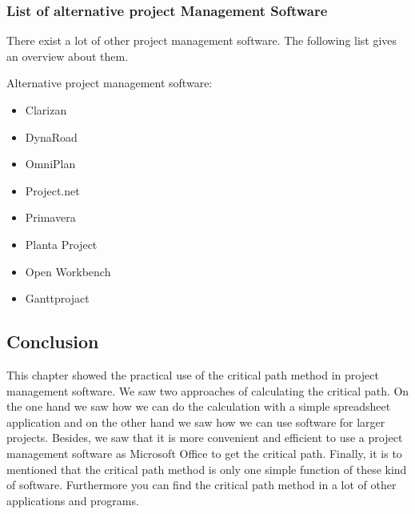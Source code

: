 \subsubsection{List of alternative project Management Software}
There exist a lot of other project management software. The following list gives an overview about them.

Alternative project management software:
\begin{itemize}
\item Clarizan
\item DynaRoad
\item OmniPlan
\item Project.net
\item Primavera
\item Planta Project
\item Open Workbench
\item Ganttprojact
\end{itemize}

\subsection{Conclusion} 
This chapter showed the practical use of the critical path method in project management software. We saw two approaches of calculating the critical path. On the one hand we saw how we can do the calculation with a simple spreadsheet application and on the other hand we saw how we can use software for larger projects. Besides, we saw that it is more convenient and efficient to use a project management software as Microsoft Office to get the critical path. Finally, it is to mentioned that the critical path method is only one simple function of these kind of software. Furthermore you can find the critical path method in a lot of other applications and programs.

